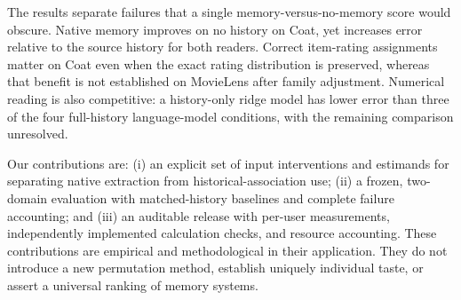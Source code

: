 The results separate failures that a single memory-versus-no-memory score would obscure. Native memory improves on no history on Coat, yet increases error relative to the source history for both readers. Correct item-rating assignments matter on Coat even when the exact rating distribution is preserved, whereas that benefit is not established on MovieLens after family adjustment. Numerical reading is also competitive: a history-only ridge model has lower error than three of the four full-history language-model conditions, with the remaining comparison unresolved.

Our contributions are: (i) an explicit set of input interventions and estimands for separating native extraction from historical-association use; (ii) a frozen, two-domain evaluation with matched-history baselines and complete failure accounting; and (iii) an auditable release with per-user measurements, independently implemented calculation checks, and resource accounting. These contributions are empirical and methodological in their application. They do not introduce a new permutation method, establish uniquely individual taste, or assert a universal ranking of memory systems.
